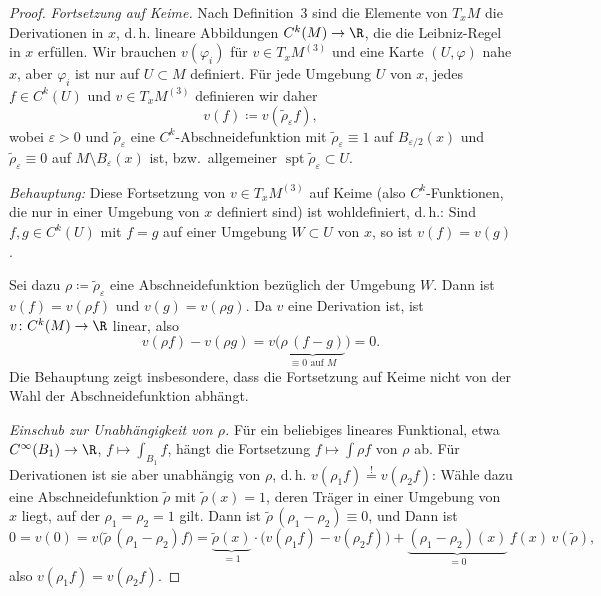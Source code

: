 \documentclass[11pt]{article}
\begin{document}
\begin{proof}
\textit{Fortsetzung auf Keime.} Nach Definition~3 sind die Elemente von $T_x M$ die Derivationen in $x$, d.\,h. lineare Abbildungen $C^k(M) \to \R$, die die Leibniz-Regel in $x$ erfüllen. Wir brauchen $v(\varphi_i)$ für $v \in T_x M^{(3)}$ und eine Karte $(U, \varphi)$ nahe $x$, aber $\varphi_i$ ist nur auf $U \subset M$ definiert. Für jede Umgebung $U$ von $x$, jedes $f \in C^k(U)$ und $v \in T_x M^{(3)}$ definieren wir daher
  \[ v(f) \coloneqq v(\tilde{\rho}_\varepsilon f), \]
  wobei $\varepsilon > 0$ und $\tilde{\rho}_\varepsilon$ eine $C^k$-Abschneidefunktion mit $\tilde{\rho}_\varepsilon \equiv 1$ auf $B_{\varepsilon/2}(x)$ und $\tilde{\rho}_\varepsilon \equiv 0$ auf $M \setminus B_\varepsilon(x)$ ist, bzw.\ allgemeiner $\operatorname{spt} \tilde{\rho}_\varepsilon \subset U$.


  \textit{Behauptung:} Diese \glqq Fortsetzung\grqq{} von $v \in T_x M^{(3)}$ auf \glqq Keime\grqq{} (also $C^k$-Funktionen, die nur in einer Umgebung von $x$ definiert sind) ist wohldefiniert, d.\,h.: Sind $f, g \in C^k(U)$ mit $f = g$ auf einer Umgebung $W \subset U$ von $x$, so ist $v(f) = v(g)$.


  Sei dazu $\rho \coloneqq \tilde{\rho}_\varepsilon$ eine Abschneidefunktion bezüglich der Umgebung $W$. Dann ist $v(f) = v(\rho f)$ und $v(g) = v(\rho g)$. Da $v$ eine Derivation ist, ist $v\colon C^k(M) \to \R$ linear, also
  \[ v(\rho f) - v(\rho g) = v\bigl(\underbrace{\rho\, (f - g)}_{\equiv 0 \text{ auf } M}\bigr) = 0. \]
Die Behauptung zeigt insbesondere, dass die \glqq Fortsetzung\grqq{} auf Keime nicht von der Wahl der Abschneidefunktion abhängt.

  \textit{Einschub zur Unabhängigkeit von $\rho$.} Für ein beliebiges lineares Funktional, etwa $C^\infty(B_1) \to \R$, $f \mapsto \int_{B_1} f$, hängt die \glqq Fortsetzung\grqq{} $f \mapsto \int \rho f$ von $\rho$ ab. Für Derivationen ist sie aber unabhängig von $\rho$, d.\,h. $v(\rho_1 f) \overset{!}{=} v(\rho_2 f)$: Wähle dazu eine Abschneidefunktion $\tilde{\rho}$ mit $\tilde{\rho}(x) = 1$, deren Träger in einer Umgebung von $x$ liegt, auf der $\rho_1 = \rho_2 = 1$ gilt. Dann ist $\tilde{\rho}\, (\rho_1 - \rho_2) \equiv 0$, und Dann ist
  \[ 0 = v(0) = v\bigl(\tilde{\rho}\, (\rho_1 - \rho_2) f\bigr) = \underbrace{\tilde{\rho}(x)}_{= 1} \cdot \bigl(v(\rho_1 f) - v(\rho_2 f)\bigr) + \underbrace{(\rho_1 - \rho_2)(x)}_{= 0}\, f(x)\, v(\tilde{\rho}), \]
  also $v(\rho_1 f) = v(\rho_2 f)$.



\end{proof}
\end{document}
